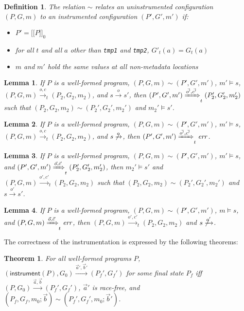 \documentclass[preprint, 10pt]{sigplanconf}
\newcommand{\meanl}{\ensuremath{[ \! [}}
\newcommand{\meanr}{\ensuremath{] \! ]}}
\newcommand{\means}[1]{\ensuremath{\meanl #1 \meanr}}
\newcommand{\instr}[2]{\ensuremath{\means{#2}_{#1}}}
\newcommand{\instrp}[1]{\ensuremath{\mathsf{instrument}(#1)}}
\newtheorem{lemma}{Lemma}
\newtheorem{theorem}{Theorem}
\newtheorem{definition}{Definition}
\begin{document}
\begin{definition}The relation $\sim$ relates an uninstrumented configuration $(P, G, m)$ to an instrumented configuration $(P', G', m')$ if:
\begin{itemize}
\item $P' = \instr{0}{P}$
\item for all $t$ and all $a$ other than \texttt{tmp1} and \texttt{tmp2}, $G'_t(a) = G_t(a)$
\item $m$ and $m'$ hold the same values at all non-metadata locations
\end{itemize}
\end{definition}
\begin{lemma}If $P$ is a well-formed program, $(P, G, m) \sim (P', G', m')$, $m' \models s$, $(P, G, m) \xrightarrow{o, c}_t (P_2, G_2, m_2)$, and $s \xrightarrow{o} s'$, then $(P', G', m') \xRightarrow{\vec{o'}, \vec{c'}}_t (P_2', G_2', m_2')$ such that $(P_2, G_2, m_2) \sim (P_2', G_2', m_2')$ and $m_2' \models s'$.\end{lemma}
\begin{lemma}If $P$ is a well-formed program, $(P, G, m) \sim (P', G', m')$, $m' \models s$, $(P, G, m) \xrightarrow{o, c}_t (P_2, G_2, m_2)$, and $s \not\xrightarrow{o}$, then $(P', G', m') \xRightarrow{\vec{o'}, \vec{c'}}_t \mathit{err}$.\end{lemma}
\begin{lemma}If $P$ is a well-formed program, $(P, G, m) \sim (P', G', m')$, $m' \models s$, and $(P', G', m') \xRightarrow{\vec{o}, \vec{c}}_t (P_2', G_2', m_2')$, then $m_2' \models s'$ and $(P, G, m) \xrightarrow{o', c'}_t (P_2, G_2, m_2)$ such that $(P_2, G_2, m_2) \sim (P_2', G_2', m_2')$ and $s \xrightarrow{o'} s'$.\end{lemma}
\begin{lemma}If $P$ is a well-formed program, $(P, G, m) \sim (P', G', m')$, $m \models s$, and $(P, G, m) \xRightarrow{\vec{o}, \vec{c}}_t \mathit{err}$, then $(P, G, m) \xrightarrow{o', c'}_t (P_2, G_2, m_2)$ and $s \not\xrightarrow{o'}$.\end{lemma}

The correctness of the instrumentation is expressed by the following theorems:
\begin{theorem}\label{safe}For all well-formed programs $P$, $(\instrp{P}, G_0) \xrightarrow{\vec{a}', \vec{b}'} (P_f', G_f')$ for some final state $P_f$ iff $(P, G_0) \xrightarrow{\vec{a}, \vec{b}} (P_f', G_f')$, $\vec{a}'$ is race-free, and $(P_f, G_f, m_0; \vec{b}) \sim (P_f', G_f', m_0; \vec{b}')$.\end{theorem}
\end{document}
